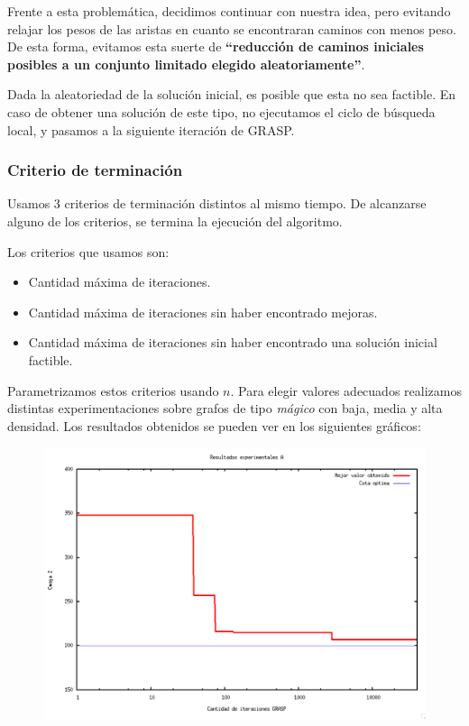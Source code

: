 Frente a esta problemática, decidimos continuar con nuestra idea, pero evitando relajar los pesos de las aristas en cuanto se encontraran caminos con menos peso. De esta forma, evitamos esta suerte de \textbf{``reducción de caminos iniciales posibles a un conjunto limitado elegido aleatoriamente''}. 

Dada la aleatoriedad de la solución inicial, es posible que esta no sea factible. En caso de obtener una solución de este tipo, no ejecutamos el ciclo de búsqueda local, y pasamos a la siguiente iteración de GRASP.

\subsubsection{Criterio de terminación}

Usamos 3 criterios de terminación distintos al mismo tiempo. De alcanzarse alguno de los criterios, se termina la ejecución del algoritmo.

Los criterios que usamos son:
\begin{itemize}
\item Cantidad máxima de iteraciones.
\item Cantidad máxima de iteraciones sin haber encontrado mejoras.
\item Cantidad máxima de iteraciones sin haber encontrado una solución inicial factible.
\end{itemize}

Parametrizamos estos criterios usando $n$. Para elegir valores adecuados realizamos distintas experimentaciones sobre grafos de tipo \textit{mágico} con baja, media y alta densidad. Los resultados obtenidos se pueden ver en los siguientes gráficos:

\begin{figure}[H]
\begin{center}
\includegraphics[angle=0, scale=.5]{imagenes/iteraciones-GRASP-A.png}
\label{Resultados experimentales A}
\end{center}
\end{figure}

